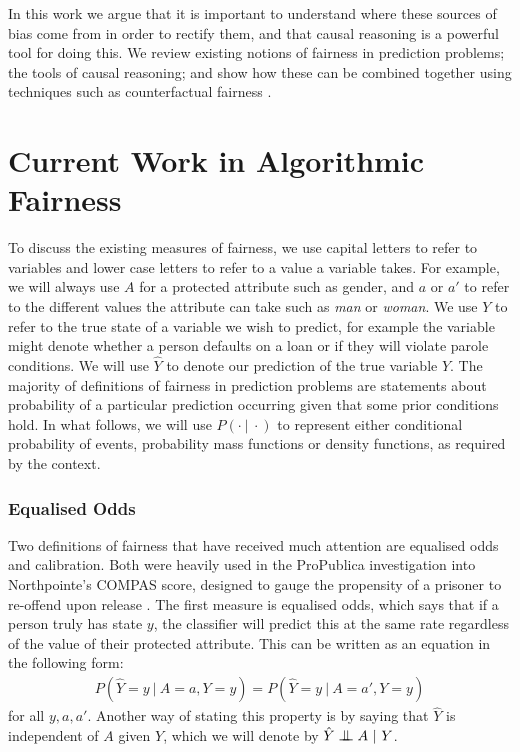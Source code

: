 \documentclass{article}
\newcommand{\cind}[0]{\mathrel{\text{\scalebox{1.07}{$\perp\mkern-10mu\perp$}}}}
\begin{document}
In this work we argue that it is important to understand where these
sources of bias come from in order to rectify them, and that causal reasoning is
a powerful tool for doing this. We review existing notions of fairness in prediction problems; the
tools of causal reasoning; and show how these can be combined together
using techniques such as counterfactual fairness \cite{kusner:17}.



\section{Current Work in Algorithmic Fairness}
\label{sec:fairness}
To discuss the existing measures of fairness, we use capital letters to refer to
variables and lower case letters to refer to a value a variable takes. For example,
we will always use $A$ for a protected attribute such as gender, and $a$ or $a'$
to refer to the different values the attribute can take such as {\em
  man} or {\em woman}. We use $Y$ to refer to the true state of a variable we
wish to predict, for example the variable might denote whether a person defaults
on a loan or if they will violate parole conditions. We will use $\hat Y$ to denote our
prediction of the true variable $Y$. The majority of definitions of fairness in prediction problems are statements about probability of a particular prediction occurring given that some prior conditions hold. In what follows, we will use
$P(\cdot\ |\ \cdot)$ to represent either conditional probability of events, probability mass functions or density functions, as required by the context.

\subsubsection{Equalised Odds}
Two definitions of fairness that have received much attention are equalised odds
and calibration. Both were heavily used in the ProPublica investigation into Northpointe's COMPAS score, designed
to gauge the propensity of a prisoner to re-offend upon release
\citep{flores2016false}. The first measure is equalised odds, which says that if
a person truly has state $y$, the classifier will predict this at the same rate regardless
of the value of their protected attribute.  This can be written as an equation in
the following form:
\begin{align}
P(\hat{Y} = y\ |\ A = a, Y = y) = P(\hat{Y} = y\ |\ A = a', Y = y) \label{eq:eo}
\end{align}
for all $y,a,a'$. Another way of stating this property is by saying that $\hat Y$ is independent of $A$ given $Y$, which we will denote by $\hat Y \cind A\ |\ Y$.  
\end{document}

